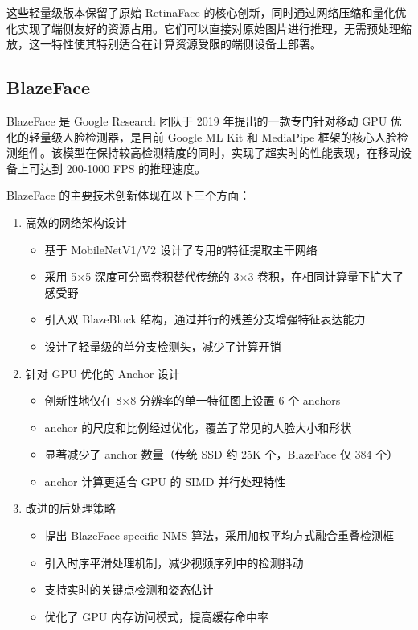 \documentclass{article}
\begin{document}
这些轻量级版本保留了原始 RetinaFace 的核心创新，同时通过网络压缩和量化优化实现了端侧友好的资源占用。它们可以直接对原始图片进行推理，无需预处理缩放，这一特性使其特别适合在计算资源受限的端侧设备上部署。

\subsection{BlazeFace}
BlazeFace\cite{bazarevsky2019blazeface} 是 Google Research 团队于 2019 年提出的一款专门针对移动 GPU 优化的轻量级人脸检测器，是目前 Google ML Kit 和 MediaPipe 框架的核心人脸检测组件。该模型在保持较高检测精度的同时，实现了超实时的性能表现，在移动设备上可达到 200-1000 FPS 的推理速度。

BlazeFace 的主要技术创新体现在以下三个方面：

\begin{enumerate}
    \item 高效的网络架构设计
    \begin{itemize}
        \item 基于 MobileNetV1/V2 设计了专用的特征提取主干网络
        \item 采用 5$\times$5 深度可分离卷积替代传统的 3$\times$3 卷积，在相同计算量下扩大了感受野
        \item 引入双 BlazeBlock 结构，通过并行的残差分支增强特征表达能力
        \item 设计了轻量级的单分支检测头，减少了计算开销
    \end{itemize}
    
    \item 针对 GPU 优化的 Anchor 设计
    \begin{itemize}
        \item 创新性地仅在 8$\times$8 分辨率的单一特征图上设置 6 个 anchors
        \item anchor 的尺度和比例经过优化，覆盖了常见的人脸大小和形状
        \item 显著减少了 anchor 数量（传统 SSD 约 25K 个，BlazeFace 仅 384 个）
        \item anchor 计算更适合 GPU 的 SIMD 并行处理特性
    \end{itemize}
    
    \item 改进的后处理策略
    \begin{itemize}
        \item 提出 BlazeFace-specific NMS 算法，采用加权平均方式融合重叠检测框
        \item 引入时序平滑处理机制，减少视频序列中的检测抖动
        \item 支持实时的关键点检测和姿态估计
        \item 优化了 GPU 内存访问模式，提高缓存命中率
    \end{itemize}
\end{enumerate}
\end{document}
